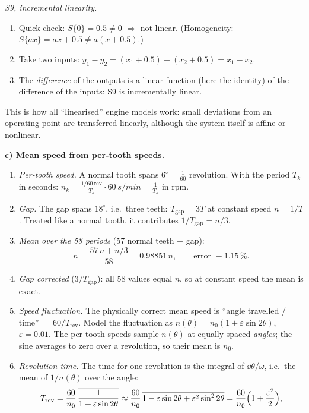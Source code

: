 \begin{solution}
\emph{S9, incremental linearity.}
\begin{enumerate}[label=Step \arabic*:,leftmargin=*,itemsep=1pt]
  \item Quick check: $S\{0\}=0.5\neq0$ $\Rightarrow$ not linear.
    (Homogeneity: $S\{ax\}=ax+0.5\neq a(x+0.5)$.)
  \item Take two inputs: $y_1-y_2=(x_1+0.5)-(x_2+0.5)=x_1-x_2$.
  \item The \emph{difference} of the outputs is a linear function (here the
    identity) of the difference of the inputs: S9 is incrementally linear.
\end{enumerate}
This is how all ``linearised'' engine models work: small deviations from an
operating point are transferred linearly, although the system itself is
affine or nonlinear.

\textbf{c) Mean speed from per-tooth speeds.}
\begin{enumerate}[label=Step \arabic*:,leftmargin=*,itemsep=1pt]
  \item \emph{Per-tooth speed.} A normal tooth spans $6^\circ=\frac1{60}$
    revolution. With the period $T_k$ in seconds:
    $n_k=\frac{1/60\ \text{rev}}{T_k}\cdot\SI{60}{s/min}=\frac{1}{T_k}$ in rpm.
  \item \emph{Gap.} The gap spans $18^\circ$, i.e.\ three teeth:
    $T_{\text{gap}}=3T$ at constant speed $n=1/T$. Treated like a normal tooth,
    it contributes $1/T_{\text{gap}}=n/3$.
  \item \emph{Mean over the 58 periods} (57 normal teeth + gap):
    \[ \bar n = \frac{57\,n+n/3}{58}=0.98851\,n,\qquad\text{error } -1.15\,\%. \]
  \item \emph{Gap corrected} ($3/T_{\text{gap}}$): all 58 values equal $n$, so
    at constant speed the mean is exact.
  \item \emph{Speed fluctuation.} The physically correct mean speed is
    ``angle travelled / time'' $=60/T_{\text{rev}}$. Model the
    fluctuation as $n(\theta)=n_0(1+\varepsilon\sin2\theta)$, $\varepsilon=0.01$.
    The per-tooth speeds sample $n(\theta)$ at equally spaced \emph{angles};
    the sine averages to zero over a revolution, so their mean is $n_0$.
  \item \emph{Revolution time.} The time for one revolution is the integral
    of $\dd\theta/\omega$, i.e.\ the mean of $1/n(\theta)$ over the angle:
    \[ T_{\text{rev}}=\frac{60}{n_0}\,\overline{\frac{1}{1+\varepsilon\sin2\theta}}
       \approx\frac{60}{n_0}\,\overline{1-\varepsilon\sin2\theta+\varepsilon^2\sin^22\theta}
       =\frac{60}{n_0}\Bigl(1+\frac{\varepsilon^2}{2}\Bigr), \]

\end{enumerate}
\end{solution}
